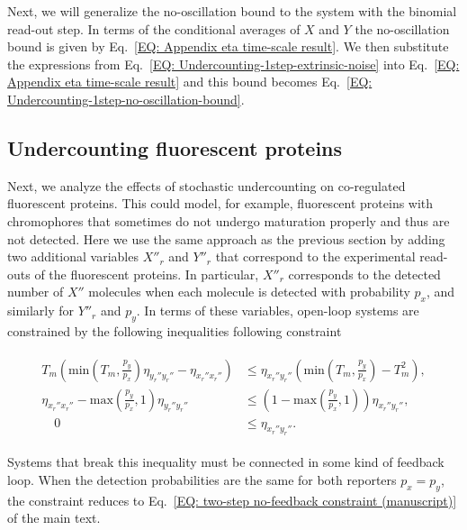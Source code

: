 \documentclass[%
 reprint,prx,
superscriptaddress,
%
%
%
%
%
%
%
%
%
 amsmath,amssymb,
 aps,
%
%
%
%
%
%
]{revtex4-2}
\begin{document}
{{Next, we will generalize the no-oscillation bound to the system with the binomial read-out step. In terms of the conditional averages of $X$ and $Y$ the no-oscillation bound is given by Eq.~\eqref{EQ: Appendix eta time-scale result}. We then substitute the expressions from Eq.~\eqref{EQ: Undercounting-1step-extrinsic-noise} into Eq.~\eqref{EQ: Appendix eta time-scale result} and this bound becomes Eq.~\eqref{EQ: Undercounting-1step-no-oscillation-bound}.


\subsection{Undercounting fluorescent proteins}
\label{SEC: Undercounting fluorescent proteins}
Next, we analyze the effects of stochastic undercounting on co-regulated fluorescent proteins. This could model, for example, fluorescent proteins with chromophores that sometimes do not undergo maturation properly and thus are not detected.
%
Here we use the same approach as the previous section by adding two additional variables $X''_{r}$  and $Y''_{r}$ that correspond to the experimental read-outs of the fluorescent proteins. In particular, $X''_{r}$ corresponds to the detected number of $X''$ molecules when each molecule is detected with probability $p_{x}$, and similarly for $Y''_{r}$ and $p_{y}$. In terms of these variables, open-loop systems  are constrained by the following inequalities
following constraint
\begin{widetext}
\begin{align}
    \begin{split}
    T_{m}\left(\text{min}\left(T_{m},\frac{p_{y}}{p_{x}}\right)\eta_{y_{r}''y_{r}''} - \eta_{x_{r}''x_{r}''}\right) &\leq \eta_{x_{r}''y_{r}''}\left(\text{min}\left(T_{m},\frac{p_{y}}{p_{x}}\right) - T_{m}^{2}\right) ,\\   \eta_{x_{r}''x_{r}''} - \text{max}\left(\frac{p_{y}}{p_{x}},1\right)\eta_{y_{r}''y_{r}''} &\leq \left(1 - \text{max}\left(\frac{p_{y}}{p_{x}},1\right) \right)\eta_{x_{r}''y_{r}''} ,\\
    \quad 0 &\leq \eta_{x_{r}''y_{r}''} .
    \end{split}
    \label{EQ: no-feedback 3-step intuitive no-feedback bound-final}
\end{align}
\end{widetext}
Systems that break this inequality must be connected in some kind of feedback loop. When the detection probabilities are the same for both reporters $p_{x} = p_{y}$, the constraint reduces to Eq.~\eqref{EQ: two-step no-feedback constraint (manuscript)} of the main text.

}}
\end{document}
